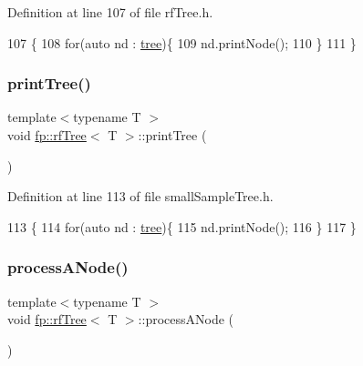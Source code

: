 Definition at line 107 of file rf\+Tree.\+h.


\begin{DoxyCode}
107                                 \{
108                     \textcolor{keywordflow}{for}(\textcolor{keyword}{auto} nd : \hyperlink{classfp_1_1rfTree_a1d5c209715f4044a85878c17e2b3ee53}{tree})\{
109                         nd.printNode();
110                     \}
111                 \}
\end{DoxyCode}
\mbox{\label{classfp_1_1rfTree_a89d982d5df6e068079d2fff5f6c15f58}} 
\subsubsection{\texorpdfstring{print\+Tree()}{printTree()}\hspace{0.1cm}{\footnotesize\ttfamily [2/2]}}
{\footnotesize\ttfamily template$<$typename T $>$ \\
void \hyperlink{classfp_1_1rfTree}{fp\+::rf\+Tree}$<$ T $>$\+::print\+Tree (\begin{DoxyParamCaption}{ }\end{DoxyParamCaption})\hspace{0.3cm}{\ttfamily [inline]}}



Definition at line 113 of file small\+Sample\+Tree.\+h.


\begin{DoxyCode}
113                                 \{
114                     \textcolor{keywordflow}{for}(\textcolor{keyword}{auto} nd : \hyperlink{classfp_1_1rfTree_a1d5c209715f4044a85878c17e2b3ee53}{tree})\{
115                         nd.printNode();
116                     \}
117                 \}
\end{DoxyCode}
\mbox{\label{classfp_1_1rfTree_ab7760333f6857ab7ce2ee29a7bc16e65}} 
\subsubsection{\texorpdfstring{process\+A\+Node()}{processANode()}\hspace{0.1cm}{\footnotesize\ttfamily [1/2]}}
{\footnotesize\ttfamily template$<$typename T $>$ \\
void \hyperlink{classfp_1_1rfTree}{fp\+::rf\+Tree}$<$ T $>$\+::process\+A\+Node (\begin{DoxyParamCaption}{ }\end{DoxyParamCaption})\hspace{0.3cm}{\ttfamily [inline]}}



